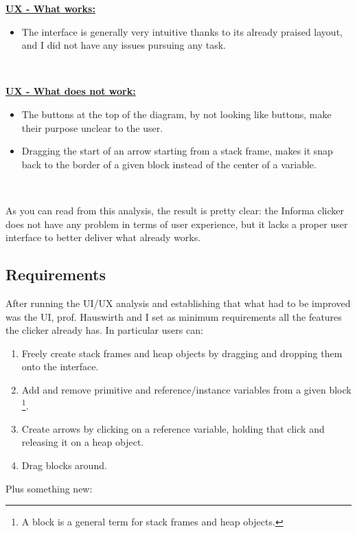 \documentclass[]{usiinfbachelorproject}
\begin{document}
\textbf{\ul{UX - What works:}}

\begin{itemize}
	\item The interface is generally very intuitive thanks to its already praised layout, and I did not have any issues pursuing any task.
\end{itemize}\

\textbf{\ul{UX - What does not work:}}

\begin{itemize}
	\item The buttons at the top of the diagram, by not looking like buttons, make their purpose unclear to the user.
	\item Dragging the start of an arrow starting from a stack frame, makes it snap back to the border of a given block instead of the center of a variable.
\end{itemize}\

\noindent As you can read from this analysis, the result is pretty clear: the Informa clicker does not have any problem in terms of user experience, but it lacks a proper user interface to better deliver what already works.

\vspace{\fill}
\pagebreak

\subsection{Requirements}

After running the UI/UX analysis and establishing that what had to be improved was the UI, prof. Hauswirth and I set as minimum requirements all the features the clicker already has. In particular users can:

\begin{enumerate}
	\item Freely create stack frames and heap objects by dragging and dropping them onto the interface.
	\item Add and remove primitive and reference/instance variables from a given block \footnote{A block is a general term for stack frames and heap objects.}.
	\item Create arrows by clicking on a reference variable, holding that click and releasing it on a heap object.
	\item Drag blocks around.
\end{enumerate}

\noindent Plus something new:
\end{document}
